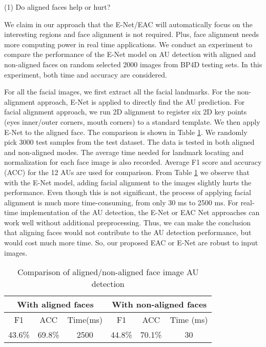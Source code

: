 \documentclass[a4paper, 10pt, conference]{ieeeconf}      %
\begin{document}
(1) Do aligned faces help or hurt?

We claim in our approach that the E-Net/EAC will automatically focus on the interesting regions and face alignment is not required. Plus, face alignment needs more computing power in real time applications. We conduct an experiment to compare the performance of the E-Net model on AU detection with aligned and non-aligned faces on random selected 2000 images from BP4D testing sets. In this experiment, both time and accuracy are considered.

For all the facial images, we first extract all the facial landmarks. For the non-alignment approach, E-Net is applied to directly find the AU prediction. For facial alignment approach, we run 2D alignment to register six 2D key points (eyes inner/outer corners, mouth corners) to a standard template. We then apply E-Net to the aligned face. The comparison is shown in Table \ref{tab5}. We randomly pick 3000 test samples from the test dataset. The data is tested in both aligned and non-aligned modes. The average time needed for landmark locating and normalization for each face image is also recorded. Average F1 score and accuracy (ACC) for the 12 AUs are used for comparison. From Table \ref{tab5} we observe that with the E-Net model, adding facial alignment to the images slightly hurts the performance. Even though this is not significant, the process of applying facial alignment is much more time-consuming, from only 30 ms to 2500 ms. For real-time implementation of the AU detection, the E-Net or EAC Net approaches can work well without additional preprocessing. Thus, we can make the conclusion that aligning faces would not contribute to the AU detection performance, but would cost much more time. So, our proposed EAC or E-Net are robust to input images.

\begin{table}
\caption{Comparison of aligned/non-aligned face image AU detection}
\label{tab5}
\begin{center}

\begin{tabular}{|c|c|c|c|c|c|}
\hline
\multicolumn{3}{|c|}{With aligned faces}&\multicolumn{3}{|c|}{With non-aligned faces}\\
\hline
F1&ACC&Time(ms)&F1&ACC&Time (ms)\\
\hline
43.6\%&69.8\%&2500& 44.8\%&70.1\%&30\\
\hline
\end{tabular}
\end{center}
\end{table}
\end{document}
